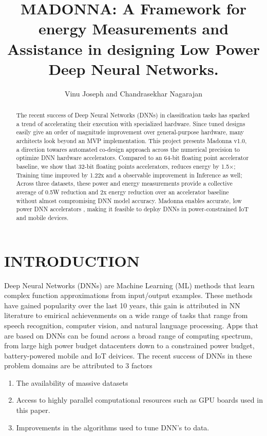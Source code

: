 \documentclass[letterpaper, 10 pt, conference]{ieeeconf}
\title{
\LARGE \textbf{MADONNA}: A Framework for energy \textbf{M}easurements and \textbf{A}ssistance \newline in designing Low Power \textbf{D}eep \textbf{N}eural \textbf{N}etworks.
}
\author{Vinu Joseph and Chandrasekhar Nagarajan}
\begin{document}
\maketitle
\thispagestyle{empty}
\pagestyle{empty}

\begin{abstract}

The recent success of Deep Neural Networks (DNNs) in
classification tasks has sparked a trend of accelerating their
execution with specialized hardware. 
Since tuned designs easily give an order of magnitude improvement over
general-purpose hardware, many architects look beyond an MVP implementation.
This project presents Madonna v1.0, a direction towares automated
co-design approach across the numerical precision 
to optimize DNN hardware accelerators.
Compared to an 64-bit floating point accelerator
baseline, we show that 32-bit floating points accelerators, reduces energy by 1.5×;
Training time improved by 1.22x and a observable improvement in Inference as well;
Across three datasets, these power and energy measurements provide a collective average
of 0.5W reduction and 2x energy reduction over an accelerator baseline
without almost compromising DNN model accuracy. 
Madonna enables accurate, low power DNN accelerators , making it feasible to deploy
DNNs in power-constrained IoT and mobile devices.  

\end{abstract}


\section{INTRODUCTION}
Deep Neural Networks (DNNs) are Machine Learning (ML) methods that learn
complex function approximations from input/output examples.
These methods have gained popularity over the last 10 years, this gain
is attributed in NN literature to emirical achievenments on a wide range
of tasks that range from speech recognition, computer vision, and natural language processing. Apps that are based on DNNs can be found across
a broad range of computing spectrum, from large high power budget datacenters
down to a constrained power budget, battery-powered mobile and IoT deivices.
The recent success of DNNs in these problem domains are be attributed to 3 factors
\begin{enumerate}
  \item The availability of massive datasets
  \item Access to highly parallel computational resources such as GPU boards used in this paper.
  \item Improvements in the algorithms used to tune DNN's to data.
\end{enumerate}
\end{document}
